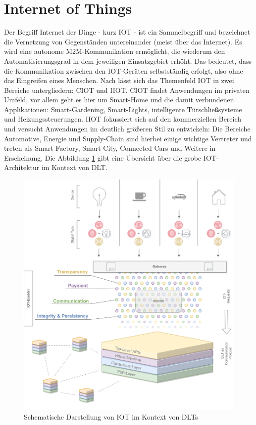 \section{Internet of Things}
\label{sec:fundamentals:iot}
Der Begriff Internet der Dinge - kurz \ac{IOT} - ist ein Sammelbegriff und bezeichnet die Vernetzung von Gegenständen untereinander (meist über das Internet). Es wird eine autonome \ac{M2M}-Kommunikation ermöglicht, die wiederum den Automatisierungsgrad in dem jeweiligen Einsatzgebiet erhöht. Das bedeutet, dass die Kommunikation zwischen den \ac{IOT}-Geräten selbstständig erfolgt, also ohne das Eingreifen eines Menschen. Nach \cite{deloitte2018} lässt sich das Themenfeld \ac{IOT} in zwei Bereiche untergliedern: \ac{CIOT} und \ac{IIOT}. \ac{CIOT} findet Anwendungen im privaten Umfeld, vor allem geht es hier um Smart-Home und die damit verbundenen Applikationen: Smart-Gardening, Smart-Lights, intelligente Türschließsysteme und Heizungssteuerungen. \ac{IIOT} fokussiert sich auf den kommerziellen Bereich und versucht Anwendungen im deutlich größeren Stil zu entwickeln: Die Bereiche Automotive, Energie und Supply-Chain sind hierbei einige wichtige Vertreter und treten als Smart-Factory, Smart-City, Connected-Cars und Weitere in Erscheinung. Die Abbildung \ref{fig:chapter02:overview-iot} gibt eine Übersicht über die grobe \ac{IOT}-Architektur im Kontext von \ac{DLT}.

\begin{figure}[h]
 \centering
 \includegraphics[width=1.0\textwidth]{gfx/Overview-IOT.png}
 \caption{Schematische Darstellung von IOT im Kontext von DLTs}
 \label{fig:chapter02:overview-iot}
\end{figure}


